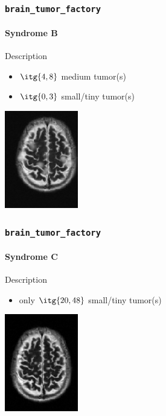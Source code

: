 \documentclass[]{beamer}
\newcommand{\btf}{\tt{brain\_tumor\_factory}}
\begin{document}
\begin{frame}
  \frametitle{\btf}
  \framesubtitle{Syndrome B}
  \begin{block}{Description}
    \begin{itemize}
      \item \alert{$\itg{4, 8}$} medium tumor(s)
      \item \alert{$\itg{0, 3}$} small/tiny tumor(s)
    \end{itemize}
  \end{block}
  \begin{center}
    \includegraphics[width=3.2cm]{resources/b1e}
  \end{center}
\end{frame}

\begin{frame}
  \frametitle{\btf}
  \framesubtitle{Syndrome C}
  \begin{block}{Description}
    \begin{itemize}
      \item only \alert{$\itg{20, 48}$} small/tiny tumor(s)
    \end{itemize}
  \end{block}
  \begin{center}
    \includegraphics[width=3.2cm]{resources/c1e}
  \end{center}
\end{frame}
\end{document}
